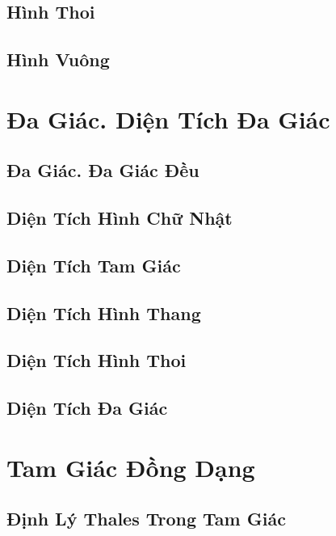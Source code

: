 \documentclass[oneside]{book}
\numberwithin{equation}{section}
\begin{document}
\section{Hình Thoi}

\section{Hình Vuông}


\chapter{Đa Giác. Diện Tích Đa Giác}

\section{Đa Giác. Đa Giác Đều}

\section{Diện Tích Hình Chữ Nhật}

\section{Diện Tích Tam Giác}

\section{Diện Tích Hình Thang}

\section{Diện Tích Hình Thoi}

\section{Diện Tích Đa Giác}


\chapter{Tam Giác Đồng Dạng}

\section{Định Lý Thales Trong Tam Giác}
\end{document}
